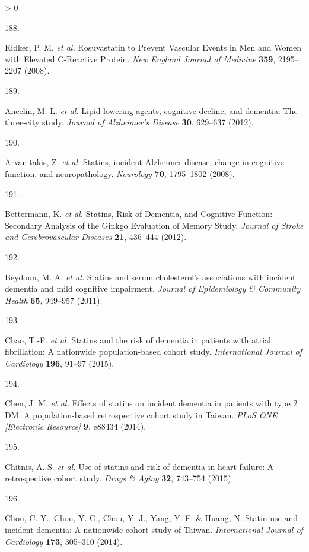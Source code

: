 \documentclass[a4paper, twoside]{templates/ociamthesis}
\newlength{\cslhangindent}
\newlength{\csllabelwidth}
\newenvironment{CSLReferences}[3] %
 {%
  \setlength{\parindent}{0pt}
  \ifodd #1 \everypar{\setlength{\hangindent}{\cslhangindent}}\ignorespaces\fi
  \ifnum #2 > 0
  \setlength{\parskip}{#2\baselineskip}
  \fi
 }%
 {}
\newcommand{\CSLLeftMargin}[1]{\parbox[t]{\maxof{\widthof{#1}}{\csllabelwidth}}{#1}}
\newcommand{\CSLRightInline}[1]{\parbox[t]{\linewidth - \csllabelwidth}{#1}}
\begin{document}
\begin{CSLReferences}{0}{0}
\leavevmode\hypertarget{ref-ridker2008}{}%
\CSLLeftMargin{188. }
\CSLRightInline{Ridker, P. M. \emph{et al.} Rosuvastatin to {Prevent Vascular Events} in {Men} and {Women} with {Elevated C}-{Reactive Protein}. \emph{New England Journal of Medicine} \textbf{359}, 2195--2207 (2008).}

\leavevmode\hypertarget{ref-ancelin2012}{}%
\CSLLeftMargin{189. }
\CSLRightInline{Ancelin, M.-L. \emph{et al.} Lipid lowering agents, cognitive decline, and dementia: The three-city study. \emph{Journal of Alzheimer's Disease} \textbf{30}, 629--637 (2012).}

\leavevmode\hypertarget{ref-arvanitakis2008}{}%
\CSLLeftMargin{190. }
\CSLRightInline{Arvanitakis, Z. \emph{et al.} Statins, incident {Alzheimer} disease, change in cognitive function, and neuropathology. \emph{Neurology} \textbf{70}, 1795--1802 (2008).}

\leavevmode\hypertarget{ref-bettermann2012}{}%
\CSLLeftMargin{191. }
\CSLRightInline{Bettermann, K. \emph{et al.} Statins, {Risk} of {Dementia}, and {Cognitive Function}: Secondary {Analysis} of the {Ginkgo Evaluation} of {Memory Study}. \emph{Journal of Stroke and Cerebrovascular Diseases} \textbf{21}, 436--444 (2012).}

\leavevmode\hypertarget{ref-beydoun2011}{}%
\CSLLeftMargin{192. }
\CSLRightInline{Beydoun, M. A. \emph{et al.} Statins and serum cholesterol's associations with incident dementia and mild cognitive impairment. \emph{Journal of Epidemiology \& Community Health} \textbf{65}, 949--957 (2011).}

\leavevmode\hypertarget{ref-chao2015}{}%
\CSLLeftMargin{193. }
\CSLRightInline{Chao, T.-F. \emph{et al.} Statins and the risk of dementia in patients with atrial fibrillation: A nationwide population-based cohort study. \emph{International Journal of Cardiology} \textbf{196}, 91--97 (2015).}

\leavevmode\hypertarget{ref-chen2014}{}%
\CSLLeftMargin{194. }
\CSLRightInline{Chen, J. M. \emph{et al.} Effects of statins on incident dementia in patients with type 2 {DM}: A population-based retrospective cohort study in {Taiwan}. \emph{PLoS ONE {[}Electronic Resource{]}} \textbf{9}, e88434 (2014).}

\leavevmode\hypertarget{ref-chitnis2015}{}%
\CSLLeftMargin{195. }
\CSLRightInline{Chitnis, A. S. \emph{et al.} Use of statins and risk of dementia in heart failure: A retrospective cohort study. \emph{Drugs \& Aging} \textbf{32}, 743--754 (2015).}

\leavevmode\hypertarget{ref-chou2014}{}%
\CSLLeftMargin{196. }
\CSLRightInline{Chou, C.-Y., Chou, Y.-C., Chou, Y.-J., Yang, Y.-F. \& Huang, N. Statin use and incident dementia: A nationwide cohort study of {Taiwan}. \emph{International Journal of Cardiology} \textbf{173}, 305--310 (2014).}


\end{CSLReferences}
\end{document}

